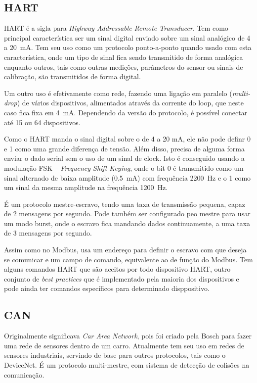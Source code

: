 \subsection{HART}
HART é a sigla para \emph{Highway Addressable Remote Transducer}. Tem como principal característica ser um sinal digital enviado sobre um sinal analógico de 4 a \SI{20}{mA}. Tem seu uso como um protocolo ponto-a-ponto quando usado com esta característica, onde um tipo de sinal fica sendo transmitido de forma analógica enquanto outros, tais como outras medições, parâmetros do sensor ou sinais de calibração, são transmitidos de forma digital.

Um outro uso é efetivamente como rede, fazendo uma ligação em paralelo (\emph{multi-drop}) de vários dispositivos, alimentados através da corrente do loop, que neste caso fica fixa em \SI{4}{mA}. Dependendo da versão do protocolo, é possível conectar até 15 ou 64 dispositivos.

Como o HART manda o sinal digital sobre o de 4 a 20 mA, ele não pode definr 0 e 1 como uma grande diferença de tensão. Além disso, precisa de alguma forma enviar o dado serial sem o uso de um sinal de clock. Isto é conseguido usando a modulação FSK -- \emph{Frequency Shift Keying}, onde o bit 0 é transmitido como um sinal alternado de baixa amplitude (\SI{0,5}{mA}) com frequência \SI{2200}{Hz} e o 1 como um sinal da mesma amplitude na frequência \SI{1200}{Hz}.

É um protocolo mestre-escravo, tendo uma taxa de transmissão pequena, capaz de 2 mensagens por segundo. Pode também ser configurado peo mestre para usar um modo burst, onde o escravo fica mandando dados continuamente, a uma taxa de 3 mensagens por segundo.

Assim como no Modbus, usa um endereço para definir o escravo com que deseja se comunicar e um campo de comando, equivalente ao de função do Modbus. Tem alguns comandos HART que são aceitos por todo dispositivo HART, outro conjunto de \emph{best practices} que é implementado pela maioria dos dispositivos e pode ainda ter comandos específicos para determinado disppositivo.

\subsection{CAN}
Originalmente significava \emph{Car Area Network}, pois foi criado pela Bosch para fazer uma rede de sensores dentro de um carro. Atualmente tem seu uso em redes de sensores industriais, servindo de base para outros protocolos, tais como o DeviceNet. É um protocolo multi-mestre, com sistema de detecção de colisões na comunicação.

